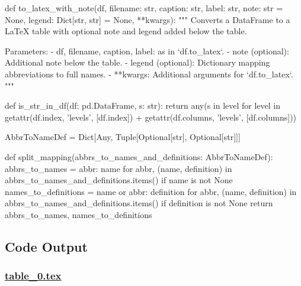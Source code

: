 \documentclass[11pt]{article}
\begin{document}
\begin{python}
def to_latex_with_note(df, filename: str, caption: str, label: str, note: str = None, legend: Dict[str, str] = None, **kwargs):
    """
    Converts a DataFrame to a LaTeX table with optional note and legend added below the table.

    Parameters:
    - df, filename, caption, label: as in `df.to_latex`.
    - note (optional): Additional note below the table.
    - legend (optional): Dictionary mapping abbreviations to full names.
    - **kwargs: Additional arguments for `df.to_latex`.
    """

def is_str_in_df(df: pd.DataFrame, s: str):
    return any(s in level for level in getattr(df.index, 'levels', [df.index]) + getattr(df.columns, 'levels', [df.columns]))

AbbrToNameDef = Dict[Any, Tuple[Optional[str], Optional[str]]]

def split_mapping(abbrs_to_names_and_definitions: AbbrToNameDef):
    abbrs_to_names = {abbr: name for abbr, (name, definition) in abbrs_to_names_and_definitions.items() if name is not None}
    names_to_definitions = {name or abbr: definition for abbr, (name, definition) in abbrs_to_names_and_definitions.items() if definition is not None}
    return abbrs_to_names, names_to_definitions

\end{python}



\subsection{Code Output}

\subsubsection*{\hyperlink{code-LaTeX Table Design-table-0-tex}{table\_0.tex}}
\end{document}
